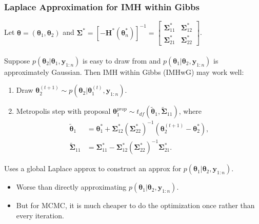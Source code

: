 \documentclass[xcolor=dvipsnames]{beamer}
\begin{document}
\begin{frame}
\frametitle{Laplace Approximation for IMH within Gibbs}
Let $\bm{\theta}=(\bm{\theta}_1,\bm{\theta}_2)$ and $\bm{\Sigma}^* = [-\bm{H}^*(\bm{\theta}^*_n)]^{-1} = \begin{bmatrix} \bm{\Sigma}^*_{11} & \bm{\Sigma}^*_{12} \\ \bm{\Sigma}^*_{21} & \bm{\Sigma}^*_{22} \end{bmatrix}$.\\~\\

Suppose $p(\bm{\theta}_2|\bm{\theta}_1, \bm{y}_{1:n})$ is easy to draw from and $p(\bm{\theta}_1|\bm{\theta}_2, \bm{y}_{1:n})$ is approximately Gaussian.  Then IMH within Gibbs (IMHwG) may work well:
\begin{enumerate}
\item Draw $\bm{\theta}_2^{(t+1)} \sim p(\bm{\theta}_2|\bm{\theta}_1^{(t)},\bm{y}_{1:n})$.
\item Metropolis step with proposal $\bm{\theta}_1^{prop}\sim t_{df}(\widetilde{\bm{\theta}}_1, \widetilde{\bm{\Sigma}}_{11})$, where 
\begin{align*}
\widetilde{\bm{\theta}}_1 &= \bm{\theta}_1^* + \bm{\Sigma}_{12}^*(\bm{\Sigma}_{22}^*)^{-1}(\bm{\theta}_2^{(t+1)} - \bm{\theta}_2^*),\\ 
\widetilde{\bm{\Sigma}}_{11} &= \bm{\Sigma}_{11}^* - \bm{\Sigma}_{12}^*(\bm{\Sigma}_{22}^*)^{-1}\bm{\Sigma}_{21}^*.
\end{align*}
\end{enumerate}
Uses a global Laplace approx to construct an approx for $p(\bm{\theta}_1|\bm{\theta}_2,\bm{y}_{1:n})$.
\begin{itemize}
\item Worse than directly approximating $p(\bm{\theta}_1|\bm{\theta}_2,\bm{y}_{1:n})$.
\item But for MCMC, it is much cheaper to do the optimization once rather than every iteration.
\end{itemize}
\end{frame}
\end{document}
